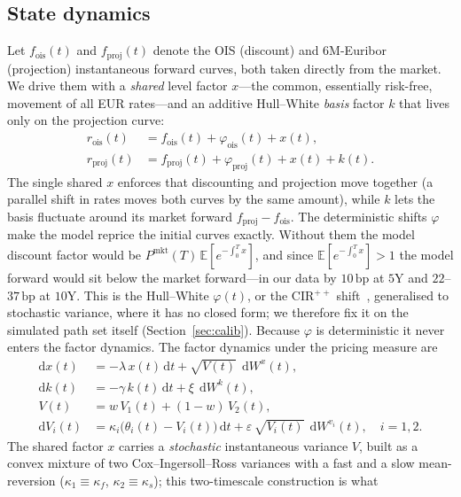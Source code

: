 \documentclass[11pt]{article}
\newcommand{\dW}{\,\mathrm{d}W}
\newcommand{\dt}{\,\mathrm{d}t}
\newcommand{\bp}{\,\text{bp}}
\begin{document}
\subsection{State dynamics}
Let \(f_{\text{ois}}(t)\) and \(f_{\text{proj}}(t)\) denote the OIS (discount) and 6M-Euribor
(projection) instantaneous forward curves, both taken directly from the market. We drive them with
a \emph{shared} level factor \(x\)---the common, essentially risk-free, movement of all EUR
rates---and an additive Hull--White \emph{basis} factor \(k\) that lives only on the projection
curve:
\begin{align}
r_{\text{ois}}(t) &= f_{\text{ois}}(t) + \varphi_{\text{ois}}(t) + x(t), \\
r_{\text{proj}}(t) &= f_{\text{proj}}(t) + \varphi_{\text{proj}}(t) + x(t) + k(t).
\end{align}
The single shared \(x\) enforces that discounting and projection move together (a parallel shift in
rates moves both curves by the same amount), while \(k\) lets the basis fluctuate around its market
forward \(f_{\text{proj}}-f_{\text{ois}}\). The deterministic shifts \(\varphi\) make the model
reprice the initial curves exactly. Without them the model discount factor would be
\(P^{\text{mkt}}(T)\,\mathbb{E}[e^{-\int_0^T x}]\), and since \(\mathbb{E}[e^{-\int_0^T x}]>1\) the
model forward would sit below the market forward---in our data by \(10\bp\) at \(5\)Y and
\(22\)--\(37\bp\) at \(10\)Y. This is the Hull--White \(\varphi(t)\), or the CIR\(^{++}\)
shift~\cite{brigo2006}, generalised to stochastic variance, where it has no closed form; we
therefore fix it on the simulated path set itself (Section~\ref{sec:calib}). Because
\(\varphi\) is deterministic it never enters the factor dynamics. The factor dynamics under the pricing measure are
\begin{align}
\mathrm{d}x(t) &= -\lambda\, x(t)\dt + \sqrt{V(t)}\;\dW^{x}(t), \\
\mathrm{d}k(t) &= -\gamma\, k(t)\dt + \xi\;\dW^{k}(t), \\
V(t) &= w\,V_1(t) + (1-w)\,V_2(t), \\
\mathrm{d}V_i(t) &= \kappa_i\big(\theta_i(t) - V_i(t)\big)\dt + \varepsilon\,\sqrt{V_i(t)}\;\dW^{v_i}(t),
\quad i=1,2 .
\end{align}
The shared factor \(x\) carries a \emph{stochastic} instantaneous variance \(V\), built as a convex
mixture of two Cox--Ingersoll--Ross variances with a fast and a slow mean-reversion
(\(\kappa_1\equiv\kappa_f\), \(\kappa_2\equiv\kappa_s\)); this two-timescale construction is what
\end{document}
